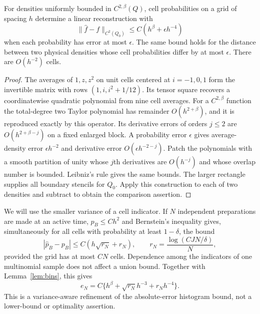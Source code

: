 \begin{lemma}\label{lem:bins}
For densities uniformly bounded in $C^{2,\beta}(Q)$, cell probabilities
on a grid of spacing $h$ determine a linear reconstruction with
\begin{equation}\label{eq:bins}
     \|\widehat f-f\|_{C^2(Q_0)}
           \le C(h^\beta+\epsilon h^{-4})
\end{equation}
when each probability has error at most $\epsilon$. The same bound
holds for the distance between two physical densities whose cell
probabilities differ by at most $\epsilon$. There are $O(h^{-2})$ cells.
\end{lemma}
\begin{proof}
The averages of $1,z,z^2$ on unit cells centered at $i=-1,0,1$ form
the invertible matrix with rows $(1,i,i^2+1/12)$. Its tensor square
recovers a coordinatewise quadratic polynomial from nine cell averages.
For a $C^{2,\beta}$ function the total-degree two Taylor polynomial
has remainder $O(h^{2+\beta})$, and it is reproduced exactly by this
operator. Its derivative errors of orders $j\le2$ are
$O(h^{2+\beta-j})$ on a fixed enlarged block. A probability error
$\epsilon$ gives average-density error $\epsilon h^{-2}$ and derivative
error $O(\epsilon h^{-2-j})$. Patch the polynomials with a smooth
partition of unity whose $j$th derivatives are $O(h^{-j})$ and whose
overlap number is bounded. Leibniz's rule gives the same bounds. The
larger rectangle supplies all boundary stencils for $Q_0$.
Apply this construction to each of two densities and subtract to obtain
the comparison assertion.
\end{proof}

We will use the smaller variance of a cell indicator. If $N$ independent
preparations are made at an active time, $p_B\le Ch^2$ and Bernstein's
inequality gives, simultaneously for all cells with probability at least
$1-\delta$, the bound
\begin{equation}\label{eq:bernstein}
 |\widehat p_B-p_B|\le C(h\sqrt{r_N}+r_N),\qquad
 r_N=\frac{\log(CJN/\delta)}{N},
\end{equation}
provided the grid has at most $CN$ cells. Dependence among the indicators
of one multinomial sample does not affect a union bound. Together with
Lemma~\ref{lem:bins}, this gives
\begin{equation}\label{eq:local-noise}
           e_N=C\{h^\beta+\sqrt{r_N}h^{-3}+r_Nh^{-4}\}.
\end{equation}
This is a variance-aware refinement of the absolute-error histogram bound,
not a lower-bound or optimality assertion.

